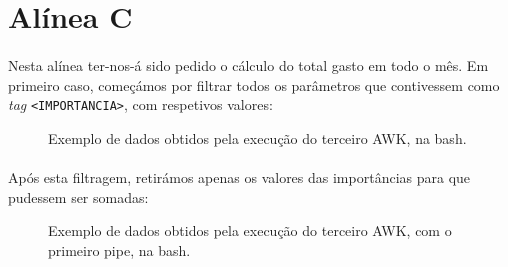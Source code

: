 \documentclass[11pt,a4paper]{report}
\begin{document}
\section{Alínea C}


\paragraph*{}Nesta alínea ter-nos-á sido pedido o cálculo do total gasto em todo o mês. Em primeiro caso, começámos por filtrar todos os parâmetros que contivessem como \textit{tag}  \texttt{<IMPORTANCIA>}, com respetivos valores:

\begin{figure}[H]
\centering
\noindent{}
\caption{Exemplo de dados obtidos pela execução do terceiro AWK, na bash.}
\end{figure}

\paragraph*{}Após esta filtragem, retirámos apenas os valores das importâncias para que pudessem ser somadas:

\begin{figure}[H]
\centering
\noindent{}
\caption{Exemplo de dados obtidos pela execução do terceiro AWK, com o primeiro pipe, na bash.}
\end{figure}
\end{document}

